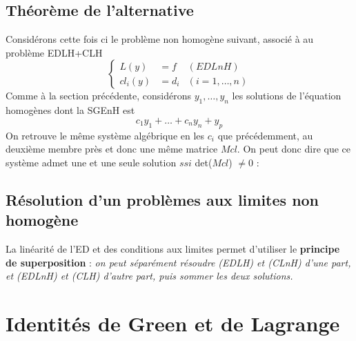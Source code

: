 \documentclass[11pt, a4paper, openany]{book}
\begin{document}
									
		\subsection{Théorème de l'alternative}
		Considérons cette fois ci le problème non homogène suivant, associé à au problème EDLH+CLH
		\begin{equation}
			\left\{\begin{array}{lll}
			L(y) &= f & (EDLnH)\\
			cl_i(y) &= d_i & (i=1,\dots,n)
			\end{array}\right.
		\end{equation}
		Comme à la section précédente, considérons $y_1,\dots,y_n$ les solutions de l'équation homogènes dont la SGEnH est
		\begin{equation}
			c_1y_1 + \dots + c_ny_n + y_p
		\end{equation}
		On retrouve le même système algébrique en les $c_i$ que précédemment, au deuxième membre près et donc une même matrice $Mcl$. On peut donc dire que ce système admet une et une seule solution $ssi$ det($Mcl$) $\neq 0$ :\\
									
										
		\subsection{Résolution d'un problèmes aux limites non homogène}
		La linéarité de l'ED et des conditions aux limites permet d'utiliser le \textbf{principe de superposition} : \textit{on peut séparément résoudre (EDLH) et (CLnH) d'une part, et (EDLnH) et (CLH) d'autre part, puis sommer les deux solutions.}
										
		\setcounter{section}{2}
		\section{Identités de Green et de Lagrange}
		\setcounter{subsection}{-1}
\end{document}
